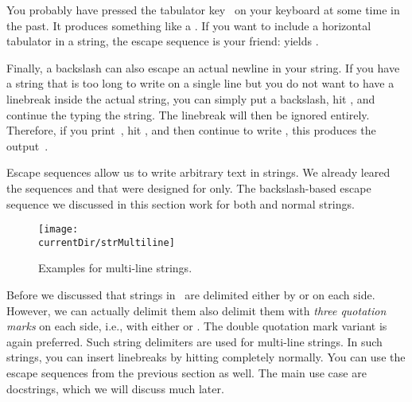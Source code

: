You probably have pressed the tabulator key~\keys{\tab} on your keyboard at some time in the past.
It produces something like a .
If you want to include a horizontal tabulator in a string, the escape sequence  is your friend:
 yields .

Finally, a backslash can also escape an actual newline in your string.
If you have a string that is too long to write on a single line but you do not want to have a linebreak inside the actual string, you can simply put a backslash, hit \keys{\enter}, and continue the typing the string.
The linebreak will then be ignored entirely.
Therefore, if you print~, hit \keys{\enter}, and then continue to write , this produces the output~.

Escape sequences allow us to write arbitrary text in strings.
We already leared the sequences \inQuotes{\textbraceleft\textbraceleft}\pythonIdx{\textbraceleft\textbraceleft} and \inQuotes{\textbraceright\textbraceright}\pythonIdx{\textbraceright\textbraceright} that were designed for  only.
The backslash-based escape sequence we discussed in this section work for both  and normal strings.%
\endhsection%
%
%
%
\begin{figure}%
\centering%
\texttt{[image: \\currentDir/strMultiline]}%
\caption{Examples for multi-line strings.}%
\label{fig:strMultiline}%
\end{figure}%
%
Before we discussed that strings in \python\ are delimited either by \pythonIdx{\textquotedbl} or \pythonIdx{\textquotesingle} on each side.
However, we can actually delimit them also delimit them with \emph{three quotation marks} on each side, i.e., with either \pythonIdx{\textquotedbl\textquotedbl\textquotedbl} or \pythonIdx{\textquotesingle\textquotesingle\textquotesingle}.
The double quotation mark variant is again preferred.
Such string delimiters are used for multi-line strings.
In such strings, you can insert linebreaks by hitting \keys{\enter} completely normally.
You can use the escape sequences from the previous section as well.
The main use case are docstrings, which we will discuss much later.

